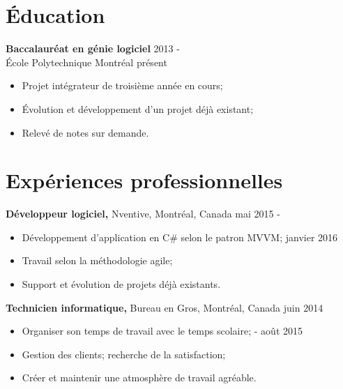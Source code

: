 \documentclass[margin]{res}
\begin{document}
\begin{resume}

  \section{\'{E}ducation}
  
  {\bf Baccalaur\'eat en g\'{e}nie logiciel} \hfill 2013 -\\ 
  \'{E}cole Polytechnique Montr\'{e}al \hfill pr\'{e}sent
  \begin{itemize} \itemsep -2pt
\item Projet int\'egrateur de troisi\`eme ann\'ee en cours;
\item \'Evolution et d\'eveloppement d'un projet d\'ej\`a existant;
  \item Relev\'{e} de notes sur demande.
  \end{itemize}

  
  \section{Exp\'{e}riences professionnelles}

  {\bf D\'eveloppeur logiciel,} Nventive, Montr\'{e}al, Canada \hfill mai 2015 -
  \begin{itemize} \itemsep -2pt  %
  \item D\'eveloppement d'application en C\# selon le patron MVVM; \hfill janvier 2016
  \item Travail selon la m\'ethodologie agile;
  \item Support et \'evolution de projets d\'ej\`a existants.
  \end{itemize}
  
  {\bf Technicien informatique,} Bureau en Gros, Montr\'{e}al, Canada \hfill juin 2014
  \begin{itemize} \itemsep -2pt  %
  \item Organiser son temps de travail avec le temps scolaire; \hfill - ao\^ut 2015
  \item Gestion des clients; recherche de la satisfaction;
  \item Cr\'{e}er et maintenir une atmosph\`{e}re de travail agr\'{e}able. 
  \end{itemize}
  

\end{resume}
\end{document}

